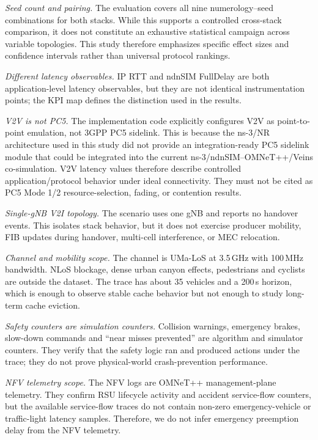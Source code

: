 \documentclass[journal]{IEEEtran}
\begin{document}
\textit{Seed count and pairing.} The evaluation covers all nine numerology--seed combinations for both stacks. While this supports a controlled cross-stack comparison, it does not constitute an exhaustive statistical campaign across variable topologies. This study therefore emphasizes specific effect sizes and confidence intervals rather than universal protocol rankings.

\textit{Different latency observables.} IP RTT and ndnSIM FullDelay are both application-level latency observables, but they are not identical instrumentation points; the KPI map defines the distinction used in the results.

\textit{V2V is not PC5.} The implementation code explicitly configures V2V as point-to-point emulation, not 3GPP PC5 sidelink. This is because the ns-3/NR architecture used in this study did not provide an integration-ready PC5 sidelink module that could be integrated into the current ns-3/ndnSIM--OMNeT++/Veins co-simulation. V2V latency values therefore describe controlled application/protocol behavior under ideal connectivity. They must not be cited as PC5 Mode 1/2 resource-selection, fading, or contention results.

\textit{Single-gNB V2I topology.} The scenario uses one gNB and reports no handover events. This isolates stack behavior, but it does not exercise producer mobility, FIB updates during handover, multi-cell interference, or MEC relocation.

\textit{Channel and mobility scope.} The channel is UMa-LoS at 3.5\,GHz with 100\,MHz bandwidth. NLoS blockage, dense urban canyon effects, pedestrians and cyclists are outside the dataset. The trace has about 35 vehicles and a 200\,s horizon, which is enough to observe stable cache behavior but not enough to study long-term cache eviction.

\textit{Safety counters are simulation counters.} Collision warnings, emergency brakes, slow-down commands and ``near misses prevented'' are algorithm and simulator counters. They verify that the safety logic ran and produced actions under the trace; they do not prove physical-world crash-prevention performance.

\textit{NFV telemetry scope.} The NFV logs are OMNeT++ management-plane telemetry. They confirm RSU lifecycle activity and accident service-flow counters, but the available service-flow traces do not contain non-zero emergency-vehicle or traffic-light latency samples. Therefore, we do not infer emergency preemption delay from the NFV telemetry.
\end{document}
